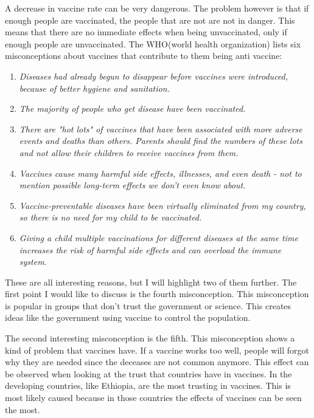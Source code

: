 \documentclass[]{article}
\begin{document}
\begin{enumerate}[a]
    A decrease in vaccine rate can be very dangerous. The problem however is 
    that if enough people are vaccinated, the people that are not are not in 
    danger. This means that there are no immediate effects when being 
    unvaccinated, only if enough people are unvaccinated. 
    The WHO(world health organization) lists six misconceptions about vaccines 
    that contribute to them being anti vaccine\cite{misconceptions}:
    \begin{enumerate}[1]
        \item \textit{Diseases had already begun to disappear before vaccines were 
        introduced, because of better hygiene and sanitation.}
        \item \textit{The majority of people who get disease have been vaccinated.}
        \item \textit{There are "hot lots" of vaccines that have been associated with 
        more adverse events and deaths than others. Parents should find the 
        numbers of these lots and not allow their children to receive vaccines 
        from them.}
        \item \textit{Vaccines cause many harmful side effects, illnesses, and even death 
        - not to mention possible long-term effects we don't even know about.}
        \item \textit{Vaccine-preventable diseases have been virtually eliminated from 
        my country, so there is no need for my child to be vaccinated.}
        \item \textit{Giving a child multiple vaccinations for different diseases at 
        the same time increases the risk of harmful side effects and can overload 
        the immune system.}

    \end{enumerate} 

    These are all interesting reasons, but I will highlight two of them further.
    The first point I would like to discuss is the fourth misconception. 
    This misconception is popular in groups that don't trust the government or 
    science. This creates ideas like the government using vaccine to control 
    the population. 

    The second interesting misconception is the fifth. This misconception shows 
    a kind of problem that vaccines have. If a vaccine works too well, people will 
    forgot why they are needed since the deceases are not common anymore. 
    This effect can be observed when looking at the trust that countries have 
    in vaccines. In the developing countries, like Ethiopia, are the most trusting 
    in vaccines\cite{anti-vaxx-map}. This is most likely caused because in those countries the effects 
    of vaccines can be seen the most.

\end{enumerate}
\end{document}
